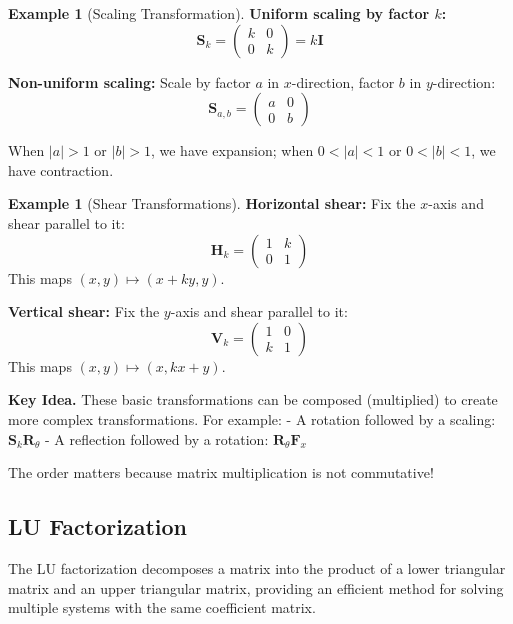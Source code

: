 \documentclass[12pt]{article}
\numberwithin{equation}{section}
\newcommand{\mat}[1]{\mathbf{#1}}        %
\theoremstyle{plain}
\theoremstyle{definition}
\newtheorem{example}[theorem]{Example}
\theoremstyle{remark}
\newenvironment{keyidea}{\begin{tcolorbox}\textbf{Key Idea.}}{\end{tcolorbox}}
\begin{document}
\begin{example}[Scaling Transformation]
\textbf{Uniform scaling by factor $k$:}
$$\mat{S}_k = \begin{pmatrix} k & 0 \\ 0 & k \end{pmatrix} = k\mat{I}$$

\textbf{Non-uniform scaling:} Scale by factor $a$ in $x$-direction, factor $b$ in $y$-direction:
$$\mat{S}_{a,b} = \begin{pmatrix} a & 0 \\ 0 & b \end{pmatrix}$$

When $|a| > 1$ or $|b| > 1$, we have expansion; when $0 < |a| < 1$ or $0 < |b| < 1$, we have contraction.
\end{example}

\begin{example}[Shear Transformations]
\textbf{Horizontal shear:} Fix the $x$-axis and shear parallel to it:
$$\mat{H}_k = \begin{pmatrix} 1 & k \\ 0 & 1 \end{pmatrix}$$
This maps $(x,y) \mapsto (x + ky, y)$.

\textbf{Vertical shear:} Fix the $y$-axis and shear parallel to it:
$$\mat{V}_k = \begin{pmatrix} 1 & 0 \\ k & 1 \end{pmatrix}$$
This maps $(x,y) \mapsto (x, kx + y)$.
\end{example}

\begin{keyidea}
These basic transformations can be composed (multiplied) to create more complex transformations. For example:
- A rotation followed by a scaling: $\mat{S}_k \mat{R}_\theta$
- A reflection followed by a rotation: $\mat{R}_\theta \mat{F}_x$

The order matters because matrix multiplication is not commutative!
\end{keyidea}

\subsection{LU Factorization}

The LU factorization decomposes a matrix into the product of a lower triangular matrix and an upper triangular matrix, providing an efficient method for solving multiple systems with the same coefficient matrix.
\end{document}
